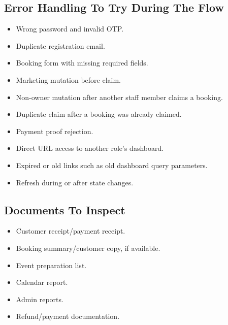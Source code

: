 \documentclass[11pt,a4paper]{article}
\begin{document}
\subsection{Error Handling To Try During The Flow}
\begin{itemize}
  \item Wrong password and invalid OTP.
  \item Duplicate registration email.
  \item Booking form with missing required fields.
  \item Marketing mutation before claim.
  \item Non-owner mutation after another staff member claims a booking.
  \item Duplicate claim after a booking was already claimed.
  \item Payment proof rejection.
  \item Direct URL access to another role's dashboard.
  \item Expired or old links such as old dashboard query parameters.
  \item Refresh during or after state changes.
\end{itemize}

\subsection{Documents To Inspect}
\begin{itemize}
  \item Customer receipt/payment receipt.
  \item Booking summary/customer copy, if available.
  \item Event preparation list.
  \item Calendar report.
  \item Admin reports.
  \item Refund/payment documentation.
\end{itemize}
\end{document}
